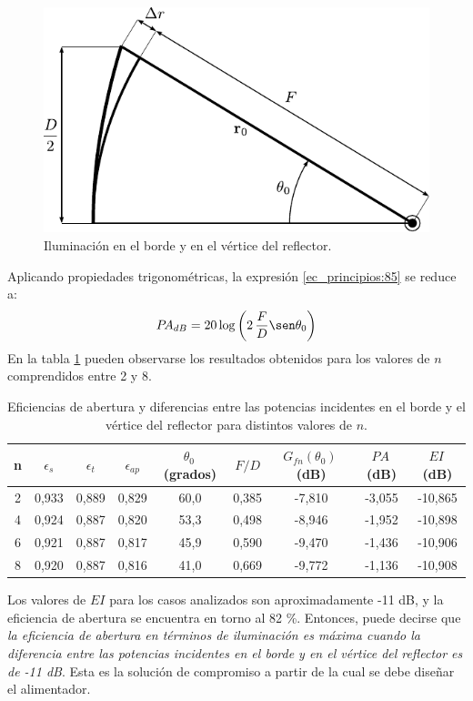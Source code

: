 \begin{figure}[H]
\centering
\includegraphics[scale = 1]{Figures/Principios/principios_11}
\caption{Iluminación en el borde y en el vértice del reflector.}
\label{fig_principios:11}
\end{figure}
Aplicando propiedades trigonométricas, la expresión \eqref{ec_principios:85} se reduce a:
\begin{align}
P\!A_{dB} = 20\log\left(2\,\dfrac{F}{D}\sen\theta_0\right)
\label{ec_principios:86}
\end{align}
En la tabla \ref{tabla_principios:1} pueden observarse los resultados obtenidos para los valores de $n$ comprendidos entre 2 y 8.
\begin{table}[H]
\centering
\begin{tabular}{|c|c|c|c|c|c|c|c|c|}
\hline
n & $\epsilon_s$ & $\epsilon_t$ & $\epsilon_{ap}$ & $\theta_0\,$(grados) & $F/D$ & $G_{fn}\left(\theta_0\right)\,$(dB) & $P\!A\,$(dB) & $EI\,$(dB)\\
\hline
2 & 0,933 & 0,889 & 0,829 & 60,0 & 0,385 & -7,810 & -3,055 & -10,865\\
\hline
4 & 0,924 & 0,887 & 0,820 & 53,3 & 0,498 & -8,946 & -1,952 & -10,898\\
\hline
6 & 0,921 & 0,887 & 0,817 & 45,9 & 0,590 & -9,470 & -1,436 & -10,906\\
\hline
8 & 0,920 & 0,887 & 0,816 & 41,0 & 0,669 & -9,772 & -1,136 & -10,908\\
\hline
\end{tabular}
\caption{Eficiencias de abertura y diferencias entre las potencias incidentes en el borde y el vértice del reflector para distintos valores de $n$.}
\label{tabla_principios:1}
\end{table}
Los valores de $EI$ para los casos analizados son aproximadamente -11 dB, y la eficiencia de abertura se encuentra en torno al 82 \%. Entonces, puede decirse que \emph{la eficiencia de abertura en términos de iluminación es máxima cuando la diferencia entre las potencias incidentes en el borde y en el vértice del reflector es de -11 dB}. Esta es la solución de compromiso a partir de la cual se debe diseñar el alimentador.


